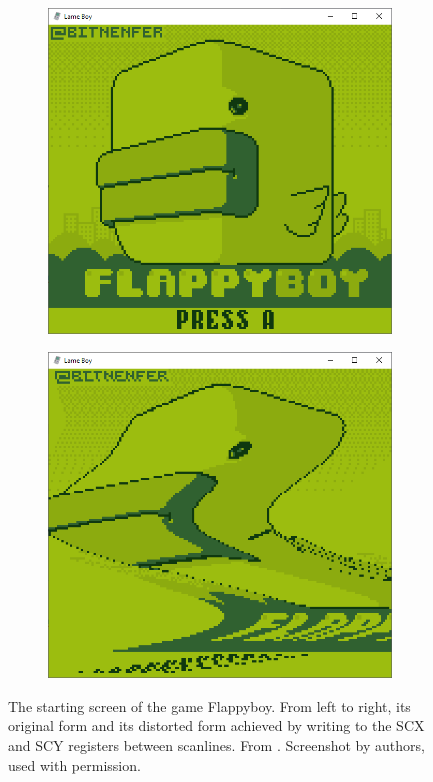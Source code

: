 \begin{figure}[H]
\centering
\begin{subfigure}{.5\textwidth}
  \centering
  \includegraphics[width=0.9\linewidth]{figures/PPU/Flappyboy_normal.PNG}
\end{subfigure}%
\begin{subfigure}{.5\textwidth}
  \centering
  \includegraphics[width=0.9\linewidth]{figures/PPU/Flappyboy_distorted.PNG}
\end{subfigure}
\caption{The starting screen of the game Flappyboy. From left to right, its original form and its distorted form achieved by writing to the SCX and SCY registers between scanlines. From \cite{FlappyBoy}. Screenshot by authors, used with permission.}
\label{fig:flappyboy}
\end{figure}   

